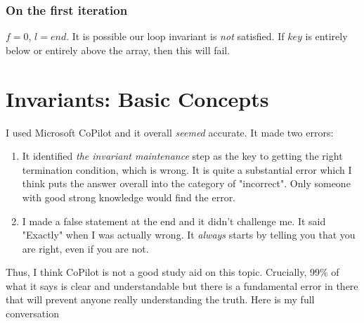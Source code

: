 \documentclass[twoside=false,DIV=14]{scrartcl}
\begin{document}
\subsubsection{On the first iteration}
$f = 0$, $l = end$.  It is possible our loop invariant is \emph{not} satisfied.  If $key$ is entirely below or entirely above the array, then this will fail.

\section{Invariants: Basic Concepts}
I used Microsoft CoPilot and it overall \emph{seemed} accurate.  It made two errors:
\begin{enumerate}
\item It identified \emph{the invariant maintenance} step as the key to getting the right termination condition, which is wrong.  It is quite a substantial error which I think puts the answer overall into the category of "incorrect".  Only someone with good strong knowledge would find the error.
\item I made a false statement at the end and it didn't challenge me.  It said "Exactly" when I was actually wrong.  It \emph{always} starts by telling you that you are right, even if you are not.
\end{enumerate}
Thus, I think CoPilot is not a good study aid on this topic.  Crucially, 99\% of what it says is clear and understandable but there is a fundamental error in there that will prevent anyone really understanding the truth.  Here is my full conversation
\end{document}
